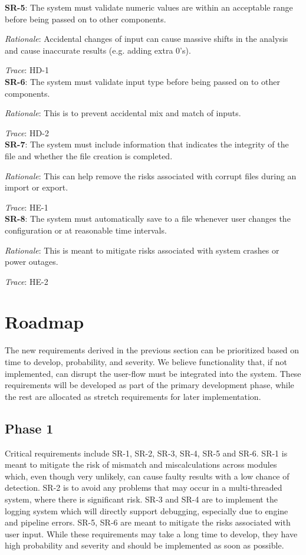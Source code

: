 \documentclass{article}
\begin{document}
\textbf{SR-5}:
The system must validate numeric values are within an acceptable range before being passed on to other components.

\emph{Rationale}: Accidental changes of input can cause massive shifts in the analysis and cause inaccurate results 
(e.g. adding extra 0’s).

\emph{Trace}: HD-1 \\

\textbf{SR-6}:
The system must validate input type before being passed on to other components.

\emph{Rationale}: This is to prevent accidental mix and match of inputs.

\emph{Trace}: HD-2\\

\textbf{SR-7}:
The system must include information that indicates the integrity of the file and whether the file creation is completed.

\emph{Rationale}: This can help remove the risks associated with corrupt files during an import or export. 

\emph{Trace}: HE-1\\

\textbf{SR-8}:
The system must automatically save to a file whenever user changes the configuration or at reasonable time intervals.

\emph{Rationale}: This is meant to mitigate risks associated with system crashes or power outages.

\emph{Trace}: HE-2\\

\section{Roadmap}

The new requirements derived in the previous section can be prioritized based on time to develop, probability, and 
severity. We believe functionality that, if not implemented, can disrupt the user-flow must be integrated into the 
system. These requirements will be developed as part of the primary development phase, while the rest are allocated as 
stretch requirements for later implementation. 

\subsection{Phase 1}
Critical requirements include SR-1, SR-2, SR-3, SR-4, SR-5 and SR-6. SR-1 is meant to mitigate the risk of mismatch and 
miscalculations across modules which, even though very unlikely, can cause faulty results with a low chance of 
detection. SR-2 is to avoid any problems that may occur in a multi-threaded system, where there is significant risk.
SR-3 and SR-4 are to implement the logging system which will directly support debugging, especially due to engine and 
pipeline errors. SR-5, SR-6 are meant to mitigate the risks associated with user input. While these requirements may 
take a long time to develop, they have high probability and severity and should be implemented as soon as possible.
\end{document}
